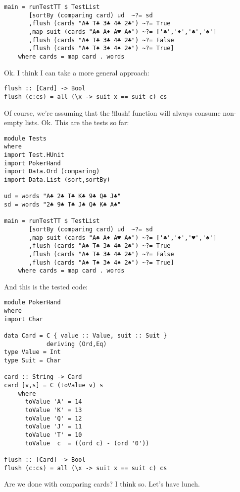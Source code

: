 \begin{lstlisting}[frame=single]
main = runTestTT $ TestList 
       [sortBy (comparing card) ud  ~?= sd
       ,flush (cards "A♣ T♣ 3♣ 4♣ 2♣") ~?= True
       ,map suit (cards "A♣ A♦ A♥ A♠") ~?= ['♣','♦','♣','♠']
       ,flush (cards "A♠ T♣ 3♣ 4♣ 2♣") ~?= False
       ,flush (cards "A♠ T♠ 3♠ 4♠ 2♠") ~?= True]
    where cards = map card . words
\end{lstlisting} %
\lhA \failure Ok. I think I can take a more general approach:
\begin{lstlisting}[frame=single]
flush :: [Card] -> Bool
flush (c:cs) = all (\x -> suit x == suit c) cs
\end{lstlisting}
\success Of course, we're assuming that the \il!flush! function will always consume non-empty lists. 
\lhN Ok. This are the tests so far:
\begin{lstlisting}[frame=single]
module Tests
where 
import Test.HUnit
import PokerHand
import Data.Ord (comparing)
import Data.List (sort,sortBy)

ud = words "A♣ 2♣ T♣ K♣ 9♣ Q♣ J♣"
sd = words "2♣ 9♣ T♣ J♣ Q♣ K♣ A♣"

main = runTestTT $ TestList 
       [sortBy (comparing card) ud  ~?= sd
       ,map suit (cards "A♣ A♦ A♥ A♠") ~?= ['♣','♦','♥','♠']
       ,flush (cards "A♣ T♣ 3♣ 4♣ 2♣") ~?= True
       ,flush (cards "A♠ T♣ 3♣ 4♣ 2♣") ~?= False
       ,flush (cards "A♠ T♠ 3♠ 4♠ 2♠") ~?= True]
    where cards = map card . words
\end{lstlisting} %
\lhA And this is the tested code:
\begin{lstlisting}[frame=single]
module PokerHand
where
import Char

data Card = C { value :: Value, suit :: Suit } 
            deriving (Ord,Eq)
type Value = Int
type Suit = Char

card :: String -> Card
card [v,s] = C (toValue v) s
    where 
      toValue 'A' = 14
      toValue 'K' = 13
      toValue 'Q' = 12
      toValue 'J' = 11
      toValue 'T' = 10
      toValue  c  = ((ord c) - (ord '0'))

flush :: [Card] -> Bool
flush (c:cs) = all (\x -> suit x == suit c) cs
\end{lstlisting}
\lhN Are we done with comparing cards?
\lhA I think so. Let's have lunch.
\lhend
